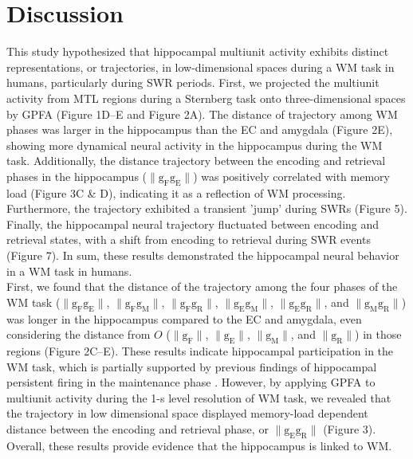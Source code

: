 \section{Discussion}
This study hypothesized that hippocampal multiunit activity exhibits distinct representations, or trajectories, in low-dimensional spaces during a WM task in humans, particularly during SWR periods. First, we projected the multiunit activity from MTL regions during a Sternberg task onto three-dimensional spaces by GPFA (Figure 1D--E and Figure 2A). The distance of trajectory among WM phases was larger in the hippocampus than the EC and amygdala (Figure 2E), showing more dynamical neural activity in the hippocampus during the WM task. Additionally, the distance trajectory between the encoding and retrieval phases in the hippocampus ($\mathrm{\lVert g_{F}g_{E} \rVert}$) was positively correlated with memory load (Figure 3C \& D), indicating it as a reflection of WM processing. Furthermore, the trajectory exhibited a transient 'jump' during SWRs (Figure 5). Finally, the hippocampal neural trajectory fluctuated between encoding and retrieval states, with a shift from encoding to retrieval during SWR events (Figure 7). In sum, these results demonstrated the hippocampal neural behavior in a WM task in humans.
\\
\indent
First, we found that the distance of the trajectory among the four phases of the WM task ($\mathrm{\lVert g_{F}g_{E} \rVert}$, $\mathrm{\lVert g_{F}g_{M} \rVert}$, $\mathrm{\lVert g_{F}g_{R} \rVert}$, $\mathrm{\lVert g_{E}g_{M} \rVert}$, $\mathrm{\lVert g_{E}g_{R} \rVert}$, and $\mathrm{\lVert g_{M}g_{R} \rVert}$) was longer in the hippocampus compared to the EC and amygdala, even considering the distance from $O$ ($\mathrm{\lVert g_{F} \rVert}$, $\mathrm{\lVert g_{E} \rVert}$, $\mathrm{\lVert g_{M} \rVert}$, and $\mathrm{\lVert g_{R} \rVert}$) in those regions (Figure 2C--E). These results indicate hippocampal participation in the WM task, which is partially supported by previous findings of hippocampal persistent firing in the maintenance phase \cite{boran_persistent_2019} \cite{kaminski_persistently_2017} \cite{kornblith_persistent_2017} \cite{faraut_dataset_2018}. However, by applying GPFA to multiunit activity during the 1-s level resolution of WM task, we revealed that the trajectory in low dimensional space displayed memory-load dependent distance between the encoding and retrieval phase, or $\mathrm{\lVert g_{E}g_{R} \rVert}$ (Figure 3). Overall, these results provide evidence that the hippocampus is linked to WM.
